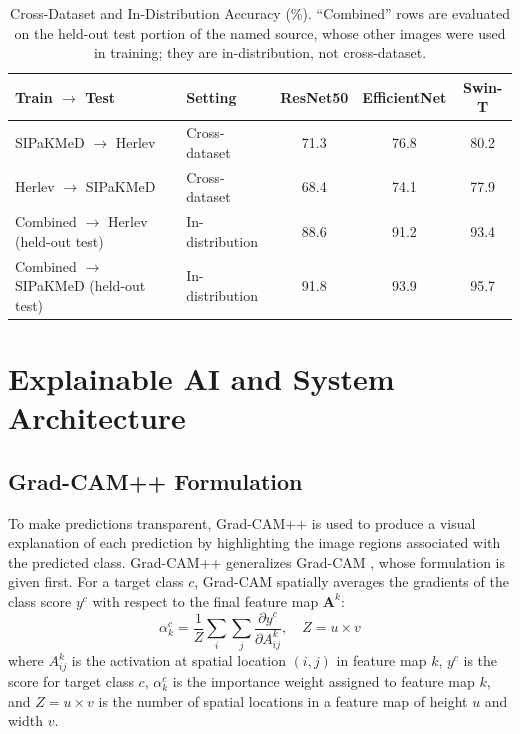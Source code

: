 \documentclass[runningheads]{llncs}
\begin{document}
\begin{table}[t]
\caption{Cross-Dataset and In-Distribution Accuracy (\%). ``Combined'' rows are evaluated on the held-out test portion of the named source, whose other images were used in training; they are in-distribution, not cross-dataset.}
\label{tab:cross}
\centering
\setlength{\tabcolsep}{3.5pt}
\begin{tabular}{llccc}
\toprule
\textbf{Train $\to$ Test} & \textbf{Setting} & \textbf{ResNet50} & \textbf{EfficientNet} & \textbf{Swin-T}\\
\midrule
SIPaKMeD $\to$ Herlev                   & Cross-dataset   & 71.3 & 76.8 & 80.2\\
Herlev $\to$ SIPaKMeD                   & Cross-dataset   & 68.4 & 74.1 & 77.9\\
\midrule
Combined $\to$ Herlev (held-out test)   & In-distribution & 88.6 & 91.2 & 93.4\\
Combined $\to$ SIPaKMeD (held-out test) & In-distribution & 91.8 & 93.9 & 95.7\\
\bottomrule
\end{tabular}
\end{table}

\section{Explainable AI and System Architecture}
\label{sec:xai}

\subsection{Grad-CAM++ Formulation}

To make predictions transparent, Grad-CAM++ \cite{chattopadhay2018} is used to produce a visual explanation of each prediction by highlighting the image regions associated with the predicted class. Grad-CAM++ generalizes Grad-CAM \cite{selvaraju2017gradcam}, whose formulation is given first. For a target class $c$, Grad-CAM spatially averages the gradients of the class score $y^c$ with respect to the final feature map $\mathbf{A}^k$:
\begin{equation}
    \alpha_k^c = \frac{1}{Z}\sum_i\sum_j
    \frac{\partial y^c}{\partial A^k_{ij}}, \quad Z = u \times v
    \label{eq:gradcam_w}
\end{equation}
where $A^k_{ij}$ is the activation at spatial location $(i,j)$ in feature map $k$, $y^c$ is the score for target class $c$, $\alpha_k^c$ is the importance weight assigned to feature map $k$, and $Z=u\times v$ is the number of spatial locations in a feature map of height $u$ and width $v$.
\end{document}
